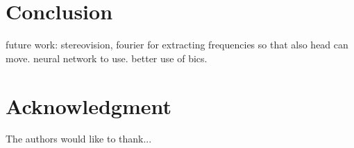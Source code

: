 \documentclass[conference]{IEEEtran}
\begin{document}
\section{Conclusion}
future work:
stereovision, fourier for extracting frequencies so that also head can move. neural network to use. better use of bics.


\section*{Acknowledgment}
The authors would like to thank...




%

%
\end{document}
